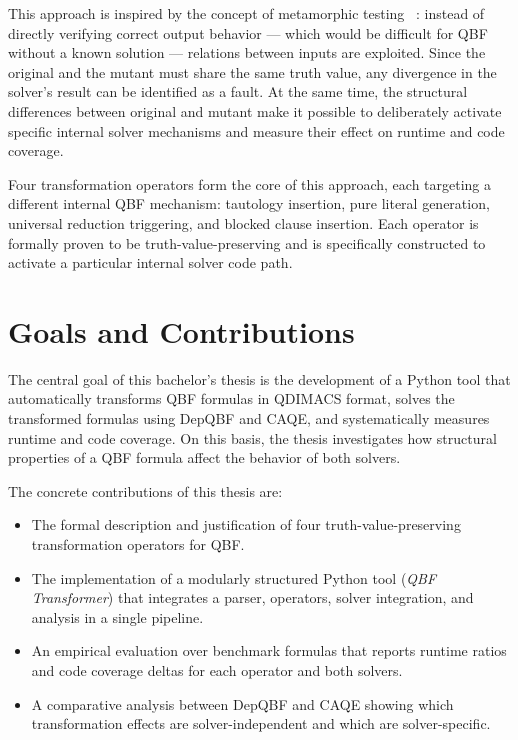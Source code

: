 This approach is inspired by the concept of metamorphic testing ~\cite{ChenEtAl2018}: instead of directly verifying correct output behavior --- which would be difficult for QBF without a known solution --- relations between inputs are exploited. Since the original and the mutant must share the same truth value, any divergence in the solver's result can be identified as a fault. At the same time, the structural differences between original and mutant make it possible to deliberately activate specific internal solver mechanisms and measure their effect on runtime and code coverage.

Four transformation operators form the core of this approach, each targeting a different internal QBF mechanism: tautology insertion, pure literal generation, universal reduction triggering, and blocked clause insertion. Each operator is formally proven to be truth-value-preserving and is specifically constructed to activate a particular internal solver code path.

\section{Goals and Contributions}\label{sec:goals}

The central goal of this bachelor's thesis is the development of a Python tool that automatically transforms QBF formulas in QDIMACS format, solves the transformed formulas using DepQBF and CAQE, and systematically measures runtime and code coverage. On this basis, the thesis investigates how structural properties of a QBF formula affect the behavior of both solvers.

The concrete contributions of this thesis are:

\begin{itemize}
    \item The formal description and justification of four truth-value-preserving transformation operators for QBF.
    \item The implementation of a modularly structured Python tool (\emph{QBF Transformer}) that integrates a parser, operators, solver integration, and analysis in a single pipeline.
    \item An empirical evaluation over benchmark formulas that reports runtime ratios and code coverage deltas for each operator and both solvers.
    \item A comparative analysis between DepQBF and CAQE showing which transformation effects are solver-independent and which are solver-specific.
\end{itemize}
